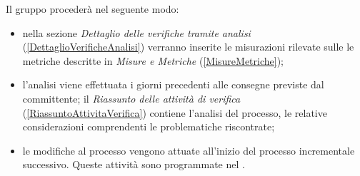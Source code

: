 	Il gruppo procederà nel seguente modo: 
	\begin{itemize}
		\item nella sezione \emph{Dettaglio delle verifiche tramite analisi} (\ref{DettaglioVerificheAnalisi}) verranno inserite le misurazioni rilevate sulle le metriche descritte in \emph{Misure e Metriche} (\ref{MisureMetriche});
		\item l'analisi viene effettuata i giorni precedenti alle consegne previste dal committente; il \emph{Riassunto delle attività di verifica} (\ref{RiassuntoAttivitaVerifica}) contiene l'analisi del processo, le relative considerazioni  comprendenti le problematiche riscontrate;
		\item le modifiche al processo vengono attuate all'inizio del processo incrementale successivo. Queste attività sono programmate nel \PianoDiProgetto.
	\end{itemize}
	
	
	
	
	
